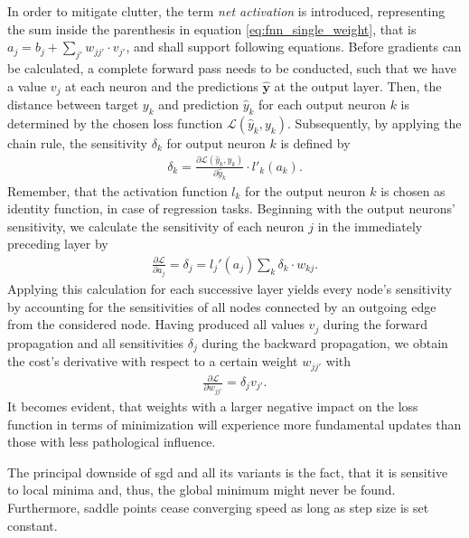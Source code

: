 In order to mitigate clutter, the term \textit{net activation} is introduced, representing the sum inside the parenthesis in equation \ref{eq:fnn_single_weight}, that is $a_j =  b_j + \sum\nolimits_{j'} w_{jj'} \cdot v_{j'}$, and shall support following equations.
Before gradients can be calculated, a complete forward pass needs to be conducted, such that we have a value $v_j$ at each neuron and the predictions $\bm{\hat{y}}$ at the output layer.
Then, the distance between target $y_k$ and prediction $\hat{y}_k$ for each output neuron $k$ is determined by the chosen loss function $\mathcal{L}(\hat{y}_k, y_k)$.
Subsequently, by applying the chain rule, the sensitivity $\delta_k$ for output neuron $k$ is defined by
\begin{align}
	\delta_k = \frac{\partial\mathcal{L}(\hat{y}_k, y_k)}{\partial\hat{y}_k}\cdot l'_k(a_k).
\end{align}
Remember, that the activation function $l_k$  for the output neuron $k$ is chosen as identity function, in case of regression tasks.
Beginning with the output neurons' sensitivity, we calculate the sensitivity of each neuron $j$ in the immediately preceding layer by
\begin{align}
	\frac{\partial\mathcal{L}}{\partial a_j} = \delta_j = l_j'(a_j)\sum\nolimits_k\delta_k\cdot w_{kj}.
\end{align}
Applying this calculation for each successive layer yields every node's sensitivity by accounting for the sensitivities of all nodes connected by an outgoing edge from the considered node.
Having produced all values $v_j$ during the forward propagation and all sensitivities $\delta_j$ during the backward propagation, we obtain the cost's derivative with respect to a certain weight $w_{jj'}$ with
\begin{align}
	\frac{\partial\mathcal{L}}{\partial w_{jj'}} = \delta_jv_{j'}.
\end{align}
It becomes evident, that weights with a larger negative impact on the loss function in terms of minimization will experience more fundamental updates than those with less pathological influence.

The principal downside of \gls{sgd} and all its variants is the fact, that it is sensitive to local minima and, thus, the global minimum might never be found.
Furthermore, saddle points cease converging speed as long as step size is set constant.

